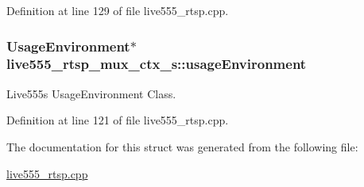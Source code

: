 Definition at line 129 of file live555\+\_\+rtsp.\+cpp.

\subsubsection[{\texorpdfstring{usage\+Environment}{usageEnvironment}}]{\setlength{\rightskip}{0pt plus 5cm}Usage\+Environment$\ast$ live555\+\_\+rtsp\+\_\+mux\+\_\+ctx\+\_\+s\+::usage\+Environment}\hypertarget{structlive555__rtsp__mux__ctx__s_aeb1c6f315ab2d2d6a7c10f014a95251a}{}\label{structlive555__rtsp__mux__ctx__s_aeb1c6f315ab2d2d6a7c10f014a95251a}
Live555\textquotesingle{}s Usage\+Environment Class. 

Definition at line 121 of file live555\+\_\+rtsp.\+cpp.



The documentation for this struct was generated from the following file\+:\begin{DoxyCompactItemize}
\item 
\hyperlink{live555__rtsp_8cpp}{live555\+\_\+rtsp.\+cpp}\end{DoxyCompactItemize}
